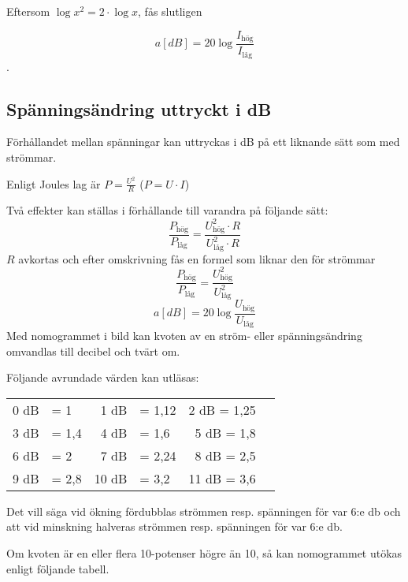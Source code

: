 Eftersom \(\log x^2 = 2 \cdot \log x\), fås slutligen

\[a[dB] = 20\log \dfrac{I_\text{hög}}{I_\text{låg}}\].

\subsection{Spänningsändring uttryckt i dB}

Förhållandet mellan spänningar kan uttryckas i dB på ett liknande sätt som med
strömmar.

Enligt Joules lag är \(P = \frac{U^2}{R}\) (\(P = U \cdot I\))

Två effekter kan ställas i förhållande till varandra på följande sätt:
\[\dfrac{P_\text{hög}}{P_\text{låg}}=\dfrac{U_\text{hög}^2 \cdot R}{U_\text{låg}^2 \cdot R}\]
\(R\) avkortas och efter omskrivning fås en formel som liknar den för strömmar
\[\dfrac{P_\text{hög}}{P_\text{låg}} = \dfrac{U_\text{hög}^2}{U_\text{låg}^2}\]
\[a[dB] = 20\log \dfrac{U_\text{hög}}{U_\text{låg}}\]
Med nomogrammet i bild  kan kvoten av en
ström- eller spänningsändring omvandlas till decibel och tvärt om.


Följande avrundade värden kan utläsas:

\begin{center}
\begin{tabular}{rlrlrl}
0 dB & = 1   &  1 dB & = 1,12 &  2 dB = 1,25 \\
3 dB & = 1,4 &  4 dB & = 1,6  &  5 dB = 1,8 \\
6 dB & = 2   &  7 dB & = 2,24 &  8 dB = 2,5 \\
9 dB & = 2,8 & 10 dB & = 3,2  & 11 dB = 3,6
\end{tabular}
\end{center}

Det vill säga vid ökning fördubblas strömmen resp. spänningen för var 6:e
\si{\decibel} och att vid minskning halveras strömmen resp. spänningen för var
6:e \si{\decibel}.

Om kvoten är en eller flera 10-potenser högre än 10, så kan nomogrammet utökas
enligt följande tabell.

